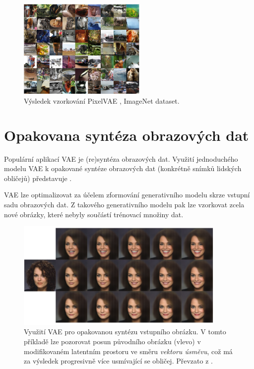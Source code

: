 \begin{figure}[H]
    \centering
    \includegraphics[width=0.55\textwidth]{figures/applications/image_net_pixel_vae_gulrajani.png}
    \caption{Výsledek vzorkování PixelVAE \cite{Gulrajani2016}, ImageNet dataset.}
    \label{fig:image_net_pixel_vae_gulrajani}
\end{figure}

\newpage
\section{Opakovana syntéza obrazových dat}
Populární aplikací VAE je (re)syntéza obrazových dat.
Využití jednoduchého modelu VAE k opakované syntéze obrazových dat (konkrétně snímků lidských obličejů) představuje \cite{White2016}.

VAE lze optimalizovat za účelem zformování generativního modelu skrze vstupní sadu obrazových dat.
Z takového generativního modelu pak lze vzorkovat zcela nové obrázky, které nebyly součástí trénovací množiny dat. \cite{Kingma2019}

\begin{figure}[H]
    \centering
    \includegraphics[width=0.9\textwidth]{figures/applications/vae_smile_vector_white.png}
    \caption{Využití VAE pro opakovanou syntézu vstupního obrázku. V tomto příkladě lze pozorovat posun původního obrázku (vlevo) v modifikovaném latentním prostoru ve směru \emph{vektoru úsměvu}, což má za výsledek progresivně více usmívající se obličej. Převzato z \cite{White2016}.}
    \label{fig:vae_smile_vector_white}
\end{figure}


